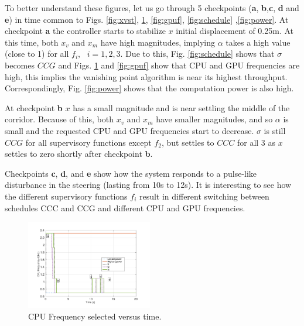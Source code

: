 To better understand these figures, let us go through 5 checkpoints (\textbf{a}, \textbf{b},\textbf{c}, \textbf{d} and \textbf{e}) in time common to Figs. \ref{fig:xvst}, \ref{fig:cpuf}, \ref{fig:gpuf}, \ref{fig:schedule} ,\ref{fig:power}.
At checkpoint \textbf{a} the controller starts to stabilize $x$ initial displacement of 0.25m. 
At this time, both $x_v$ and $x_m$ have high magnitudes, implying $\alpha$ takes a high value (close to 1) for all $f_i,\text{ }i=1,2,3$. 
Due to this, Fig. \ref{fig:schedule} shows that $\sigma$ becomes $CCG$ and Figs. \ref{fig:cpuf} and \ref{fig:gpuf} show that CPU and GPU frequencies are high, this implies the vanishing point algorithm is near its highest throughput. Correspondingly, Fig. \ref{fig:power} shows that the computation power is also high.

At checkpoint \textbf{b} $x$ has a small magnitude and is near settling the middle of the corridor. Because of this, both $x_v$ and $x_m$ have smaller magnitudes, and so $\alpha$ is small and the requested CPU and GPU frequencies start to decrease. $\sigma$ is still $CCG$ for all supervisory functions except $f_2$, but settles to $CCC$ for all 3 as $x$ settles to zero shortly after checkpoint \textbf{b}.

Checkpoints \textbf{c}, \textbf{d}, and \textbf{e} show how the system responds to a pulse-like disturbance in the steering (lasting from 10s to 12s). It is interesting to see how the different supervisory functions $f_i$ result in different switching between schedules CCC and CCG and different CPU and GPU frequencies.
 
\begin{figure}[hbtp]
\centering
\includegraphics[width=0.49\textwidth]{../simulations/figs/CPUF.pdf}
\caption{CPU Frequency selected versus time.}
\label{fig:cpuf} 
\end{figure}


